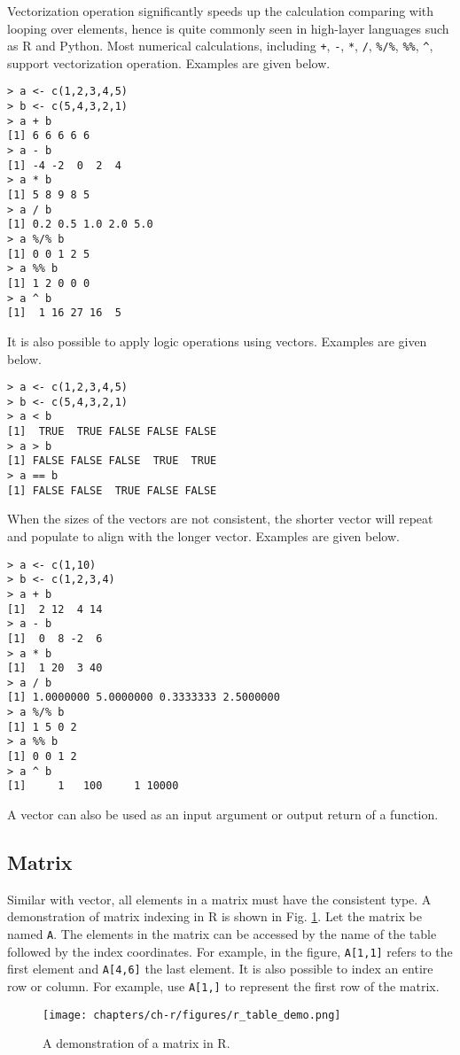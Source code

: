 Vectorization operation significantly speeds up the calculation comparing with looping over elements, hence is quite commonly seen in high-layer languages such as R and Python. Most numerical calculations, including \verb|+|, \verb|-|, \verb|*|, \verb|/|, \verb|%/%|, \verb|%%|, \verb|^|, support vectorization operation. Examples are given below.
\begin{lstlisting}
> a <- c(1,2,3,4,5)
> b <- c(5,4,3,2,1)
> a + b
[1] 6 6 6 6 6
> a - b
[1] -4 -2  0  2  4
> a * b
[1] 5 8 9 8 5
> a / b
[1] 0.2 0.5 1.0 2.0 5.0
> a %/% b
[1] 0 0 1 2 5
> a %% b
[1] 1 2 0 0 0
> a ^ b
[1]  1 16 27 16  5
\end{lstlisting}
It is also possible to apply logic operations using vectors. Examples are given below.
\begin{lstlisting}
> a <- c(1,2,3,4,5)
> b <- c(5,4,3,2,1)
> a < b
[1]  TRUE  TRUE FALSE FALSE FALSE
> a > b
[1] FALSE FALSE FALSE  TRUE  TRUE
> a == b
[1] FALSE FALSE  TRUE FALSE FALSE
\end{lstlisting}
When the sizes of the vectors are not consistent, the shorter vector will repeat and populate to align with the longer vector. Examples are given below.
\begin{lstlisting}
> a <- c(1,10)
> b <- c(1,2,3,4)
> a + b
[1]  2 12  4 14
> a - b
[1]  0  8 -2  6
> a * b
[1]  1 20  3 40
> a / b
[1] 1.0000000 5.0000000 0.3333333 2.5000000
> a %/% b
[1] 1 5 0 2
> a %% b
[1] 0 0 1 2
> a ^ b
[1]     1   100     1 10000
\end{lstlisting}

A vector can also be used as an input argument or output return of a function.

\subsection{Matrix}

Similar with vector, all elements in a matrix must have the consistent type. A demonstration of matrix indexing in R is shown in Fig. \ref{ch:r1:fig:r_table_demo}. Let the matrix be named \verb|A|. The elements in the matrix can be accessed by the name of the table followed by the index coordinates. For example, in the figure, \verb|A[1,1]| refers to the first element and \verb|A[4,6]| the last element. It is also possible to index an entire row or column. For example, use \verb|A[1,]| to represent the first row of the matrix.

\begin{figure}
	\centering
	\texttt{[image: chapters/ch-r/figures/r\_table\_demo.png]}
	\caption{A demonstration of a matrix in R.} \label{ch:r1:fig:r_table_demo}
\end{figure}

